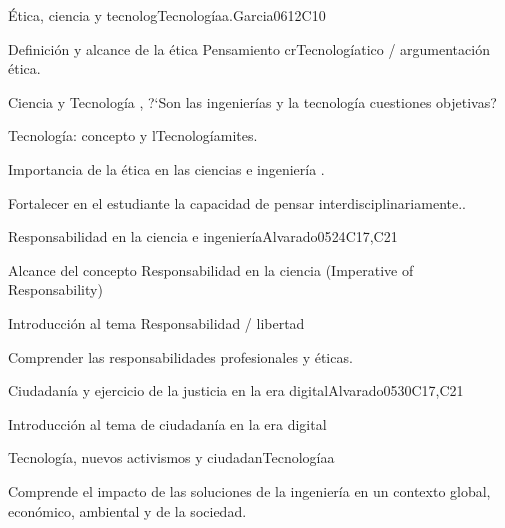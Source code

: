 \begin{syllabus}
\begin{unit}{Ética, ciencia y tecnologTecnologíaa.}{}{Garcia06}{12}{C10}
   \begin{topics}
      \item Definición y alcance de la ética Pensamiento crTecnologíatico /  argumentación ética.
      \item Ciencia y Tecnología , ?`Son las ingenierías y la tecnología cuestiones objetivas? 
      \item Tecnología: concepto y lTecnologíamites.
      \item Importancia de la ética en las ciencias e ingeniería .
   \end{topics}
   \begin{learningoutcomes}
      \item Fortalecer en el estudiante la capacidad de pensar interdisciplinariamente..
   \end{learningoutcomes}
\end{unit}

\begin{unit}{Responsabilidad en la ciencia e ingeniería}{}{Alvarado05}{24}{C17,C21}
   \begin{topics}
      \item Alcance del concepto  Responsabilidad en la ciencia (Imperative of Responsability)
      \item Introducción al tema Responsabilidad / libertad 
      \end{topics}

   \begin{learningoutcomes}
      \item  Comprender las responsabilidades profesionales y éticas.
   \end{learningoutcomes}
\end{unit}

\begin{unit}{Ciudadanía y ejercicio de la justicia en la era digital}{}{Alvarado05}{30}{C17,C21}
   \begin{topics}
      \item Introducción al tema de ciudadanía en la era digital
      \item Tecnología,  nuevos activismos y ciudadanTecnologíaa
   \end{topics}

   \begin{learningoutcomes}
      \item Comprende el impacto de las soluciones de la ingeniería en un contexto global, económico, ambiental y de la sociedad.
   \end{learningoutcomes}
\end{unit}

\begin{coursebibliography}
\end{coursebibliography}

\end{syllabus}
